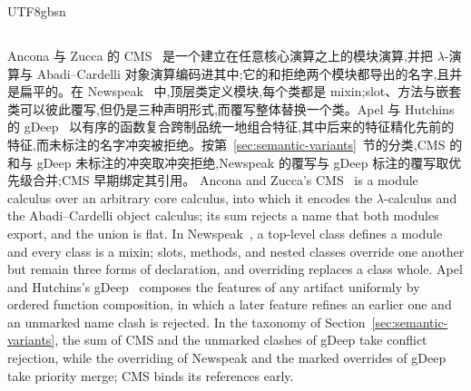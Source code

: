 \begin{CJK*}{UTF8}{gbsn}
\subsection{}

\ifPaperChinese
Ancona 与 Zucca 的 CMS~\cite{ancona2002-module-systems-calculus} 是一个建立在任意核心演算之上的模块演算,并把 $\lambda$-演算与 Abadi--Cardelli 对象演算编码进其中;它的和拒绝两个模块都导出的名字,且并是扁平的。在 Newspeak~\cite{bracha2010-newspeak-modules-as-objects} 中,顶层类定义模块,每个类都是 mixin;slot、方法与嵌套类可以彼此覆写,但仍是三种声明形式,而覆写整体替换一个类。Apel 与 Hutchins 的 gDeep~\cite{apel2010-uniform-feature-composition} 以有序的函数复合跨制品统一地组合特征,其中后来的特征精化先前的特征,而未标注的名字冲突被拒绝。按第~\ref{sec:semantic-variants}~节的分类,CMS 的和与 gDeep 未标注的冲突取冲突拒绝,Newspeak 的覆写与 gDeep 标注的覆写取优先级合并;CMS 早期绑定其引用。
\else
Ancona and Zucca's CMS~\cite{ancona2002-module-systems-calculus} is
a module calculus over an arbitrary core calculus, into which it
encodes the $\lambda$-calculus and the Abadi--Cardelli object
calculus; its sum rejects a name that both modules export, and the
union is flat.
In Newspeak~\cite{bracha2010-newspeak-modules-as-objects}, a top-level
class defines a module and every class is a mixin; slots, methods, and
nested classes override one another but remain three forms of
declaration, and overriding replaces a class whole.
Apel and Hutchins's gDeep~\cite{apel2010-uniform-feature-composition}
composes the features of any artifact uniformly by ordered function
composition, in which a later feature refines an earlier one and an
unmarked name clash is rejected.
In the taxonomy of Section~\ref{sec:semantic-variants}, the sum of CMS and the unmarked clashes of
gDeep take conflict rejection, while the overriding of Newspeak and the marked overrides of gDeep take
priority merge; CMS binds its references early.
\fi



\end{CJK*}
